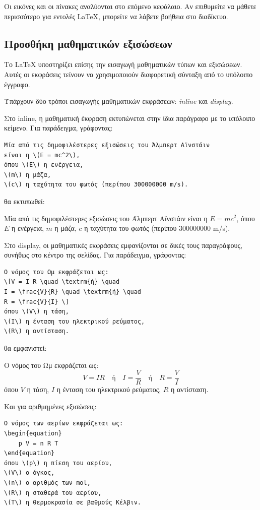 \documentclass[inscr,ack,preface]{dimscthesis}
\begin{document}
Οι εικόνες και οι πίνακες αναλύονται στο επόμενο κεφάλαιο.
Αν επιθυμείτε να μάθετε περισσότερο για εντολές \LaTeX{}, μπορείτε να λάβετε βοήθεια στο διαδίκτυο.

\subsection{Προσθήκη μαθηματικών εξισώσεων} \label{adding_math_equations}

Το \LaTeX{} υποστηρίζει επίσης την εισαγωγή μαθηματικών τύπων και εξισώσεων.
Αυτές οι εκφράσεις τείνουν να χρησιμοποιούν διαφορετική σύνταξη από το υπόλοιπο έγγραφο.

Υπάρχουν δύο τρόποι εισαγωγής μαθηματικών εκφράσεων: \emph{inline} και \emph{display}.

Στο inline, η μαθηματική έκφραση εκτυπώνεται στην ίδια παράγραφο με το υπόλοιπο κείμενο.
Για παράδειγμα, γράφοντας:
\begin{verbatim}
Μία από τις δημοφιλέστερες εξισώσεις του Άλμπερτ Αϊνστάιν
είναι η \(E = mc^2\),
όπου \(E\) η ενέργεια,
\(m\) η μάζα,
\(c\) η ταχύτητα του φωτός (περίπου 300000000 m/s).
\end{verbatim}

θα εκτυπωθεί:

Μία από τις δημοφιλέστερες εξισώσεις του Άλμπερτ Αϊνστάιν
είναι η \(E = mc^2\),
όπου \(E\) η ενέργεια,
\(m\) η μάζα,
\(c\) η ταχύτητα του φωτός (περίπου 300000000 m/s).

Στο display, οι μαθηματικές εκφράσεις εμφανίζονται σε δικές τους παραγράφους, συνήθως στο κέντρο της σελίδας.
Για παράδειγμα, γράφοντας:
\begin{verbatim}
Ο νόμος του Ωμ εκφράζεται ως:
\[V = I R \quad \textrm{ή} \quad
I = \frac{V}{R} \quad \textrm{ή} \quad
R = \frac{V}{I} \]
όπου \(V\) η τάση,
\(I\) η ένταση του ηλεκτρικού ρεύματος,
\(R\) η αντίσταση.
\end{verbatim}

θα εμφανιστεί:

Ο νόμος του Ωμ εκφράζεται ως:
\[V = I R \quad \textrm{ή} \quad
I = \frac{V}{R} \quad \textrm{ή} \quad
R = \frac{V}{I} \]
όπου \(V\) η τάση,
\(I\) η ένταση του ηλεκτρικού ρεύματος,
\(R\) η αντίσταση.

Και για αριθμημένες εξισώσεις:
\begin{verbatim}
Ο νόμος των αερίων εκφράζεται ως:
\begin{equation}
    p V = n R T
\end{equation}
όπου \(p\) η πίεση του αερίου,
\(V\) ο όγκος,
\(n\) ο αριθμός των mol,
\(R\) η σταθερά του αερίου,
\(T\) η θερμοκρασία σε βαθμούς Κέλβιν.
\end{verbatim}
\end{document}
